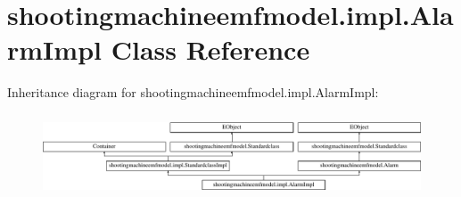 \hypertarget{classshootingmachineemfmodel_1_1impl_1_1_alarm_impl}{\section{shootingmachineemfmodel.\-impl.\-Alarm\-Impl Class Reference}
\label{classshootingmachineemfmodel_1_1impl_1_1_alarm_impl}
}
Inheritance diagram for shootingmachineemfmodel.\-impl.\-Alarm\-Impl\-:\begin{figure}[H]
\begin{center}
\leavevmode
\includegraphics[height=2.497213cm]{classshootingmachineemfmodel_1_1impl_1_1_alarm_impl}
\end{center}
\end{figure}
